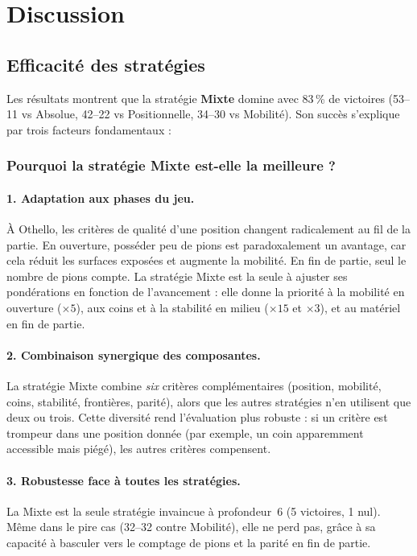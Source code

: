 \documentclass[12pt, a4paper]{article}
\begin{document}
\section{Discussion}
\label{sec:discussion}

\subsection{Efficacité des stratégies}

Les résultats montrent que la stratégie \textbf{Mixte} domine avec 83\,\% de victoires (53--11 vs Absolue, 42--22 vs Positionnelle, 34--30 vs Mobilité). Son succès s'explique par trois facteurs fondamentaux :

\subsubsection{Pourquoi la stratégie Mixte est-elle la meilleure ?}

\paragraph{1. Adaptation aux phases du jeu.}
À Othello, les critères de qualité d'une position changent radicalement au fil de la partie. En ouverture, posséder peu de pions est paradoxalement un avantage, car cela réduit les surfaces exposées et augmente la mobilité. En fin de partie, seul le nombre de pions compte. La stratégie Mixte est la seule à ajuster ses pondérations en fonction de l'avancement : elle donne la priorité à la mobilité en ouverture ($\times 5$), aux coins et à la stabilité en milieu ($\times 15$ et $\times 3$), et au matériel en fin de partie.

\paragraph{2. Combinaison synergique des composantes.}
La stratégie Mixte combine \textit{six} critères complémentaires (position, mobilité, coins, stabilité, frontières, parité), alors que les autres stratégies n'en utilisent que deux ou trois. Cette diversité rend l'évaluation plus robuste : si un critère est trompeur dans une position donnée (par exemple, un coin apparemment accessible mais piégé), les autres critères compensent.

\paragraph{3. Robustesse face à toutes les stratégies.}
La Mixte est la seule stratégie invaincue à profondeur~6 (5 victoires, 1 nul). Même dans le pire cas (32--32 contre Mobilité), elle ne perd pas, grâce à sa capacité à basculer vers le comptage de pions et la parité en fin de partie.
\end{document}
